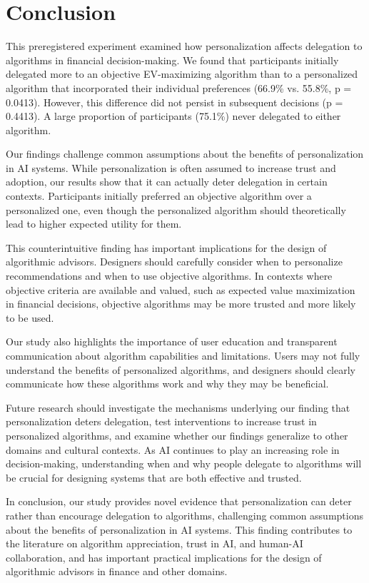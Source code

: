 \section{Conclusion}

This preregistered experiment examined how personalization affects delegation to algorithms in financial decision-making. We found that participants initially delegated more to an objective EV-maximizing algorithm than to a personalized algorithm that incorporated their individual preferences (66.9\% vs. 55.8\%, p = 0.0413). However, this difference did not persist in subsequent decisions (p = 0.4413). A large proportion of participants (75.1\%) never delegated to either algorithm.

Our findings challenge common assumptions about the benefits of personalization in AI systems. While personalization is often assumed to increase trust and adoption, our results show that it can actually deter delegation in certain contexts. Participants initially preferred an objective algorithm over a personalized one, even though the personalized algorithm should theoretically lead to higher expected utility for them.

This counterintuitive finding has important implications for the design of algorithmic advisors. Designers should carefully consider when to personalize recommendations and when to use objective algorithms. In contexts where objective criteria are available and valued, such as expected value maximization in financial decisions, objective algorithms may be more trusted and more likely to be used.

Our study also highlights the importance of user education and transparent communication about algorithm capabilities and limitations. Users may not fully understand the benefits of personalized algorithms, and designers should clearly communicate how these algorithms work and why they may be beneficial.

Future research should investigate the mechanisms underlying our finding that personalization deters delegation, test interventions to increase trust in personalized algorithms, and examine whether our findings generalize to other domains and cultural contexts. As AI continues to play an increasing role in decision-making, understanding when and why people delegate to algorithms will be crucial for designing systems that are both effective and trusted.

In conclusion, our study provides novel evidence that personalization can deter rather than encourage delegation to algorithms, challenging common assumptions about the benefits of personalization in AI systems. This finding contributes to the literature on algorithm appreciation, trust in AI, and human-AI collaboration, and has important practical implications for the design of algorithmic advisors in finance and other domains.